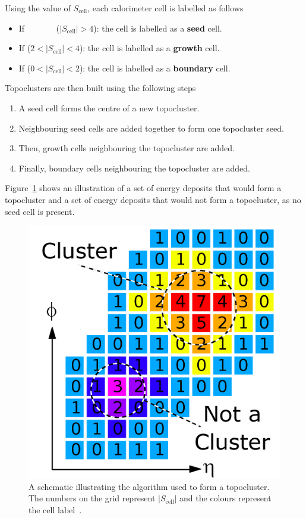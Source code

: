 \noindent
Using the value of $S_{\text{cell}}$, each calorimeter cell is labelled as follows
\vspace{-1em}
\begin{itemize}
\item If \ \ \ \ \ \ \ ($|S_{\text{cell}}| > 4$): the cell is labelled as a \textbf{seed} cell.
\item If ($2 < |S_{\text{cell}}| < 4$): the cell is labelled as a \textbf{growth} cell.
\item If ($0 < |S_{\text{cell}}| < 2$): the cell is labelled as a \textbf{boundary} cell.
\end{itemize}
Topoclusters are then built using the following steps
\vspace{-1em}
\begin{enumerate}
\item A seed cell forms the centre of a new topocluster.
\item Neighbouring seed cells are added together to form one topocluster seed.
\item Then, growth cells neighbouring the topocluster are added.
\item Finally, boundary cells neighbouring the topocluster are added.
\end{enumerate}
Figure~\ref{fig:obj-topo_schem} shows an illustration of a set of energy deposits that would form a topocluster
and a set of energy deposits that would not form a topocluster, as no seed cell is present.

\begin{figure}[!htb]
  \begin{center}
    \includegraphics[width=0.35\linewidth, angle=0]{figs/Objects/topo_schem.png}
  \end{center}
  \caption[A schematic illustrating the algorithm used to form a topocluster.]
          {A schematic illustrating the algorithm used to form a topocluster. The numbers on the grid represent $|S_{\text{cell}}|$ and the colours represent the cell label~\cite{det-magnet_fig}.}
  \label{fig:obj-topo_schem}
\vspace{-0.5em}
\end{figure}

